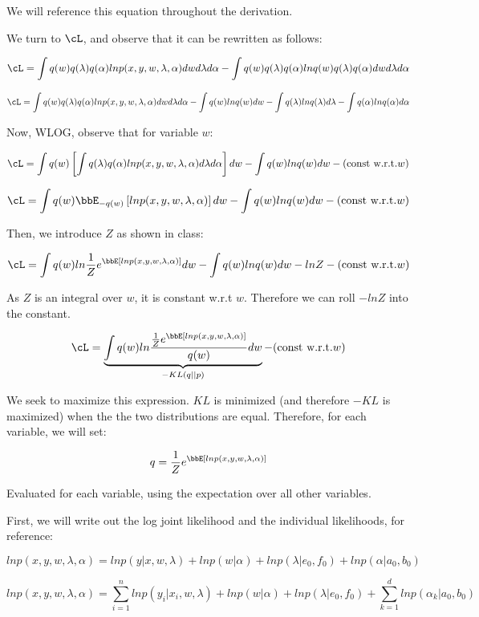 \documentclass[twoside,11pt]{homework}
\begin{document}
We will reference this equation throughout the derivation.

We turn to $\cL$, and observe that it can be rewritten as follows:

\[
\cL =
\int q(w)q(\lambda)q(\alpha) ln p(x,y,w, \lambda, \alpha) dw d\lambda d\alpha
- \int q(w)q(\lambda)q(\alpha) lnq(w)q(\lambda)q(\alpha) dw d\lambda d\alpha
\]

\begin{equation}
\cL =
\int q(w)q(\lambda)q(\alpha) ln p(x,y,w, \lambda, \alpha) dw d\lambda d\alpha
- \int q(w)lnq(w)dw
- \int q(\lambda)lnq(\lambda)d\lambda
- \int q(\alpha)lnq(\alpha) d\alpha
\end{equation}

Now, WLOG, observe that for variable $w$:

\[
\cL =
\int q(w)
\Brackets{ \int
q(\lambda)q(\alpha) ln p(x,y,w, \lambda, \alpha) d\lambda d\alpha
} dw
- \int q(w)lnq(w)dw
- (\text{const w.r.t.} w)
\]

\[
\cL =
\int q(w)
\bbE_{-q(w)} \Brackets{
ln p(x,y,w, \lambda, \alpha)
} dw
- \int q(w)lnq(w)dw
- (\text{const w.r.t.} w)
\]

Then, we introduce $Z$ as shown in class:

\[
\cL =
\int q(w) ln \frac{1}{Z}e^{
\bbE \Brackets{
ln p(x,y,w, \lambda, \alpha)
}} dw
- \int q(w)lnq(w)dw
- lnZ - (\text{const w.r.t.} w)
\]

As $Z$ is an integral over $w$, it is constant w.r.t $w$. Therefore we can roll $-lnZ$ into the constant.

\[
\cL =
\underbrace{
\int q(w) ln \frac{\frac{1}{Z} e^{
\bbE \Brackets{
ln p(x,y,w, \lambda, \alpha)
}}}{
q(w)
} dw
}_{-KL(q||p)}
- (\text{const w.r.t.} w)
\]

We seek to maximize this expression. $KL$ is minimized (and therefore $-KL$ is maximized) when the the two distributions are equal. Therefore, for each variable, we will set:

\[
q = \frac{1}{Z} e^{
\bbE \Brackets{
ln p(x,y,w, \lambda, \alpha)
}}
\]

Evaluated for each variable, using the expectation over all other variables.

First, we will write out the log joint likelihood and the individual likelihoods, for reference:

\[
ln p(x,y,w, \lambda, \alpha) = 
ln p(y | x, w, \lambda) + ln p(w | \alpha) + ln p(\lambda | e_0, f_0) + ln p(\alpha | a_0, b_0)
\]

\begin{equation}
ln p(x,y,w, \lambda, \alpha) = 
 \sum_{i=1}^n  ln p(y_i | x_i, w, \lambda) + ln p(w | \alpha)
+ ln p(\lambda | e_0, f_0) + \sum_{k=1}^d ln p(\alpha_k | a_0, b_0)
\end{equation}
\end{document}
